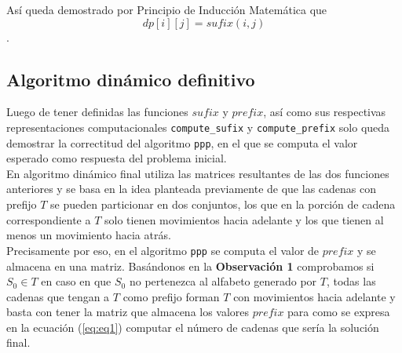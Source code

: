 \documentclass[a4paper]{article}
\begin{document}
	Así queda demostrado por Principio de Inducción Matemática que $$dp[i][j]=sufix(i,j)$$.
	
	
	
	
	
		
	
	\subsection*{Algoritmo din\'amico definitivo}

    Luego de tener definidas las funciones $sufix$ y $prefix$, as\'i como sus respectivas 
    representaciones computacionales \texttt{compute\_sufix} y \texttt{compute\_prefix} solo queda 
    demostrar la correctitud del algoritmo \texttt{ppp}, en el que se computa el valor esperado como respuesta del problema inicial.\\ 

    En algoritmo din\'amico final utiliza las matrices resultantes de las dos funciones anteriores y se basa en la idea planteada 
    previamente de que las cadenas con prefijo $T$ se pueden particionar en dos conjuntos, los que en la porci\'on de cadena 
    correspondiente a $T$ solo tienen movimientos hacia adelante y los que tienen al menos un movimiento hacia atr\'as.\\ 
    
    Precisamente por eso, en el algoritmo \texttt{ppp} se computa el valor de $prefix$ y se almacena en una matriz. Bas\'andonos en 
    la \textbf{Observaci\'on 1} comprobamos si $S_0 \in T$ en caso en que $S_0$ no pertenezca al alfabeto generado por $T$,
     todas las cadenas que tengan a $T$ como prefijo forman $T$ con movimientos hacia adelante y basta con tener la matriz que almacena los valores $prefix$
     para como se expresa en la ecuaci\'on (\ref{eq:eq1}) computar el n\'umero de cadenas que ser\'ia la soluci\'on final.\\ 
\end{document}
